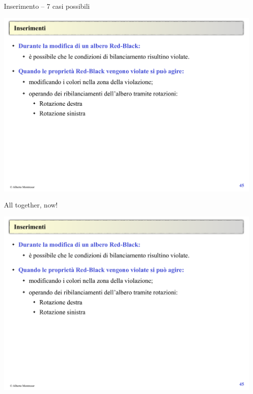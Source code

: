 \begin{frame}{Inserimento -- 7 casi possibili}

\includegraphics[width=1.0\textwidth,page=17]{redblack2.pdf}

\end{frame}

\begin{frame}{All together, now!}

\includegraphics[width=1.0\textwidth,page=18]{redblack2.pdf}

\end{frame}

